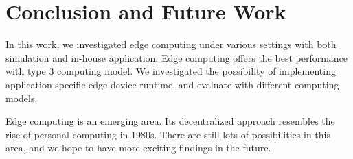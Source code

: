 \section{Conclusion and Future Work}
\label{sec:conclusion}

In this work, we investigated edge computing under various settings
with both simulation and in-house application. Edge computing offers
the best performance with type 3 computing model. We investigated the
possibility of implementing application-specific edge device runtime,
and evaluate with different computing models.

Edge computing is an emerging area. Its decentralized approach resembles
the rise of personal computing in 1980s. There are still lots of possibilities
in this area, and we hope to have more exciting findings in the future.
